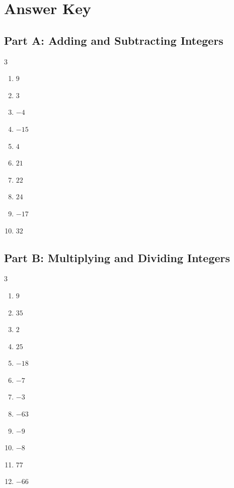 \documentclass[11pt]{article}
\begin{document}
\newpage
{}
\section*{Answer Key}
\subsection*{Part A: Adding and Subtracting Integers}
\begin{multicols}{3}
\begin{enumerate}
  \item $9$
  \item $3$
  \item $-4$
  \item $-15$
  \item $4$
  \item $21$
  \item $22$
  \item $24$
  \item $-17$
  \item $32$
\end{enumerate}
\end{multicols}
\subsection*{Part B: Multiplying and Dividing Integers}
\begin{multicols}{3}
\begin{enumerate}
  \item $9$
  \item $35$
  \item $2$
  \item $25$
  \item $-18$
  \item $-7$
  \item $-3$
  \item $-63$
  \item $-9$
  \item $-8$
  \item $77$
  \item $-66$
\end{enumerate}
\end{multicols}
\end{document}
